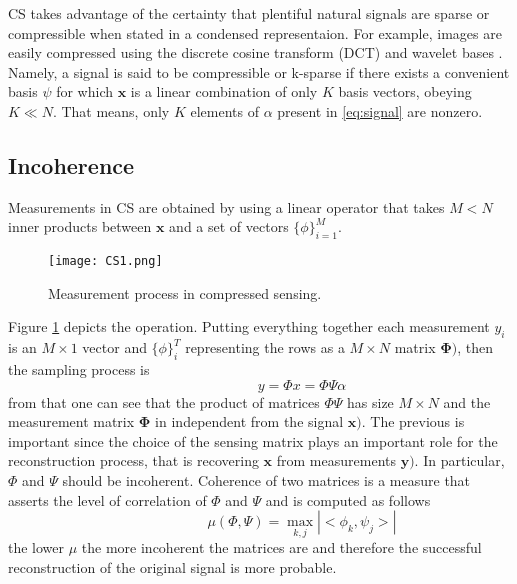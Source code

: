 CS takes advantage of the certainty that plentiful natural signals are sparse or compressible when stated in a condensed representaion. For example, images are easily compressed using the discrete cosine transform (DCT) and wavelet bases \cite{mallat1999wavelet}. Namely, a signal is said to be compressible or k-sparse if there exists a convenient basis $\psi$ for which $\mathbf{x}$ is a linear combination of only $K$ basis vectors, obeying $K \ll N$. That means, only $K$ elements of $\alpha$ present in \ref{eq:signal} are nonzero. 

\subsection{Incoherence}
Measurements in CS are obtained by using a linear operator that takes $M < N$ inner products between $\mathbf{x}$ and a set of vectors $\{\phi\}_{i=1}^{M}$. \begin{figure}[tb] 
\centering 
\texttt{[image: CS1.png]} 
\caption[Compressed sensing measurement process]{Measurement process in compressed sensing.}
\label{fig:csmea} 
\end{figure}
Figure \ref{fig:csmea} depicts the operation. Putting everything together each measurement $y_i$ is an $ M \times 1$ vector and $\{\phi\}_{i}^{T}$ representing the rows as a $ M \times N$ matrix $\mathbf{\Phi)}$, then the sampling process is
\begin{equation} \label{eq:signal2}
\hspace{3em} \hspace{3em} \hspace{3em} y = \Phi x = \Phi\Psi\alpha \hspace{3em}
\end{equation}    
from that one can see that the product of matrices $\Phi\Psi$ has size $ M \times N$ and the measurement matrix $\mathbf{\Phi}$ in independent from the signal $\mathbf{x)}$. The previous is important since the choice of the sensing matrix plays an important role for the reconstruction process, that is recovering $\mathbf{x}$ from measurements $\mathbf{y)}$. In particular, $\Phi$ and $\Psi$ should be incoherent. Coherence of two matrices is a measure that asserts the level of correlation of $\Phi$ and $\Psi$ and is computed as follows
\begin{equation} \label{eq:signal3}
\hspace{3em} \hspace{3em} \hspace{3em} \mu(\Phi,\Psi) = \max_{k,j}|<\phi_k,\psi_j>|  \hspace{3em}
\end{equation}   
the lower $\mu$ the more incoherent the matrices are and therefore the successful reconstruction of the original signal is more probable.

